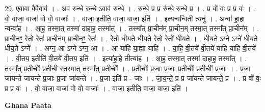 \documentclass[17pt]{extarticle}
\begin{document}
29. ए॒वावा वै॒वैवाव॑ । . अव॑ रुन्धे रु॒न्धे ऽवाव॑ रुन्धे । . रु॒न्धे॒ प्र प्र रु॑न्धे रुन्धे॒ प्र । . प्र वो॑ वः॒ प्र प्र वः॑ । . वो॒ वाजा॒ वाजा॑ वो वो॒ वाजाः᳚ । . वाजा॒ इतीति॒ वाजा॒ वाजा॒ इति॑ । . इत्यन्वन्विती त्यनु॑ । . अन्वा॑ हा॒हा न्वन्वा॑ह । . आ॒ह॒ तस्मा॒त् तस्मा॑ दाहाह॒ तस्मा᳚त् । . तस्मा᳚त् प्रा॒चीन॑म् प्रा॒चीन॒म् तस्मा॒त् तस्मा᳚त् प्रा॒चीन᳚म् । . प्रा॒चीनꣳ॒॒ रेतो॒ रेतः॑ प्रा॒चीन॑म् प्रा॒चीनꣳ॒॒ रेतः॑ । . रेतो॑ धीयते धीयते॒ रेतो॒ रेतो॑ धीयते । . धी॒य॒ते ऽग्ने ऽग्ने॑ धीयते धीय॒ते ऽग्ने᳚ । . अग्न॒ आ ऽग्ने ऽग्न॒ आ । . आ या॑हि या॒ह्या या॑हि । . या॒हि॒ वी॒तये॑ वी॒तये॑ याहि याहि वी॒तये᳚ । . वी॒तय॒ इतीति॑ वी॒तये॑ वी॒तय॒ इति॑ । . इत्या॑हा॒हे तीत्या॑ह । . आ॒ह॒ तस्मा॒त् तस्मा॑ दाहाह॒ तस्मा᳚त् । . तस्मा᳚त् प्र॒तीचीः᳚ प्र॒तीची॒ स्तस्मा॒त् तस्मा᳚त् प्र॒तीचीः᳚ । . प्र॒तीचीः᳚ प्र॒जाः प्र॒जाः प्र॒तीचीः᳚ प्र॒तीचीः᳚ प्र॒जाः । . प्र॒जा जा॑यन्ते जायन्ते प्र॒जाः प्र॒जा जा॑यन्ते । . प्र॒जा इति॑ प्र - जाः । . जा॒य॒न्ते॒ प्र प्र जा॑यन्ते जायन्ते॒ प्र । . प्र वो॑ वः॒ प्र प्र वः॑ । . वो॒ वाजा॒ वाजा॑ वो वो॒ वाजाः᳚ । . वाजा॒ इतीति॒ वाजा॒ वाजा॒ इति॑ । \newline

\textbf{Ghana Paata } \newline
\end{document}
